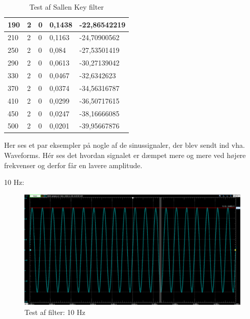 \begin{table}[h!]
\begin{tabular}{l|l|l|l|l}
		\hline
		190 & 2 & 0 & 0,1438 & -22,86542219 \\
		\hline
		210 & 2 & 0 & 0,1163 & -24,70900562 \\
		\hline
		250 & 2 & 0 & 0,084 & -27,53501419 \\
		\hline
		290 & 2 & 0 & 0,0613 & -30,27139042 \\
		\hline
		330 & 2 & 0 & 0,0467 & -32,6342623 \\
		\hline
		370 & 2 & 0 & 0,0374 & -34,56316787 \\
		\hline
		410 & 2 & 0 & 0,0299 & -36,50717615 \\
		\hline
		450 & 2 & 0 & 0,0247 & -38,16666085 \\
		\hline
		500 & 2 & 0 & 0,0201 & -39,95667876
	\end{tabular}
\caption{Test af Sallen Key filter}
\label{tab:filtertest}
\end{table}

\clearpage
Her ses et par eksempler på nogle af de sinussignaler, der blev sendt ind vha. Waveforms. Hér ses det hvordan signalet er dæmpet mere og mere ved højere frekvenser og derfor får en lavere amplitude.

10 Hz:
\begin{figure}[h!]
	\centering
	\includegraphics[width=1\linewidth]{Hardwaredesign/10hz}
	\caption{Test af filter: 10 Hz}
	\label{fig:10hz}
\end{figure}

